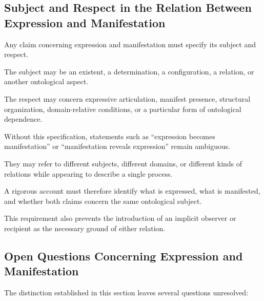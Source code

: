 \subsection{Subject and Respect in the Relation Between Expression and Manifestation}

Any claim concerning expression and manifestation must
specify its subject and respect.

The subject may be an existent, a determination, a
configuration, a relation, or another ontological aspect.

The respect may concern expressive articulation,
manifest presence, structural organization, domain-relative
conditions, or a particular form of ontological dependence.

Without this specification, statements such as
``expression becomes manifestation'' or
``manifestation reveals expression'' remain ambiguous.

They may refer to different subjects, different domains,
or different kinds of relations while appearing to
describe a single process.

A rigorous account must therefore identify what is
expressed, what is manifested, and whether both claims
concern the same ontological subject.

This requirement also prevents the introduction of
an implicit observer or recipient as the necessary
ground of either relation.

\subsection{Open Questions Concerning Expression and Manifestation}

The distinction established in this section leaves
several questions unresolved:

